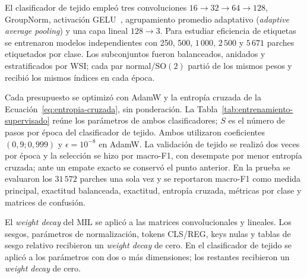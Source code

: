 El clasificador de tejido empleó tres convoluciones
\(16\rightarrow32\rightarrow64\rightarrow128\), GroupNorm,
activación GELU~\cite{hendrycks_gelu_2016}, agrupamiento promedio adaptativo (\emph{adaptive average pooling}) y
una capa lineal
\(128\rightarrow3\). Para estudiar eficiencia de etiquetas se entrenaron
modelos independientes con 250, 500, \(1\,000\), \(2\,500\) y \(5\,671\)
parches etiquetados por clase. Los subconjuntos fueron balanceados, anidados y
estratificados por WSI; cada par normal/\(\mathrm{SO}(2)\) partió de los mismos
pesos y recibió los mismos índices en cada época.

Cada presupuesto se optimizó con AdamW y la entropía cruzada de la
Ecuación~\eqref{eq:entropia-cruzada}, sin ponderación.
La Tabla~\ref{tab:entrenamiento-supervisado} reúne los parámetros de ambos
clasificadores; \(S\) es el número de pasos por época del clasificador de
tejido. Ambos utilizaron coeficientes \((0,9;0,999)\) y
\(\epsilon=10^{-8}\) en AdamW. La validación de tejido se realizó dos veces
por época y la selección se hizo por macro-F1, con desempate por menor
entropía cruzada; ante un empate exacto se conservó el punto anterior.
En la prueba se evaluaron los
\(31\,572\) parches una sola vez y se reportaron macro-F1 como medida principal,
exactitud balanceada, exactitud, entropía cruzada, métricas por clase y matrices
de confusión.

El \emph{weight decay} del MIL se aplicó a las matrices convolucionales y
lineales. Los sesgos, parámetros de normalización, tokens CLS/REG, keys
nulas y tablas de sesgo relativo recibieron un \emph{weight decay} de cero. En el
clasificador de tejido se aplicó a los parámetros con dos o más dimensiones;
los restantes recibieron un \emph{weight decay} de cero.

